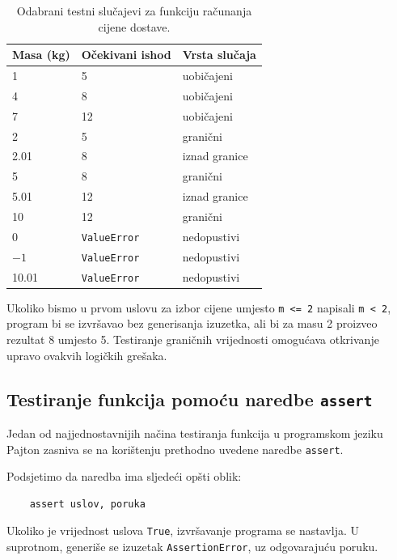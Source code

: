 \begin{table}[ht]
	\centering
	\begin{tabular}{lll}
		\hline
		Masa (kg) & Očekivani ishod & Vrsta slučaja \\ \hline
		1         & 5 & uobičajeni \\
		4         & 8 & uobičajeni \\
		7         & 12 & uobičajeni \\
		2         & 5 & granični \\
		2.01      & 8 & iznad granice \\
		5         & 8 & granični \\
		5.01      & 12 & iznad granice \\
		10        & 12 & granični \\
		0         & \texttt{ValueError} & nedopustivi \\
		$-1$      & \texttt{ValueError} & nedopustivi \\
		10.01     & \texttt{ValueError} & nedopustivi \\ \hline
	\end{tabular}
	\caption{Odabrani testni slučajevi za funkciju 
		računanja cijene dostave.}
	\label{tab:test-dostava}
\end{table}

Ukoliko bismo u prvom uslovu za izbor cijene umjesto 
\texttt{m <= 2} napisali \texttt{m < 2}, program bi se 
izvršavao bez generisanja izuzetka, ali bi za masu 2 
proizveo rezultat 8 umjesto 5. Testiranje graničnih 
vrijednosti omogućava otkrivanje upravo ovakvih 
logičkih grešaka.


\subsection{Testiranje funkcija pomoću naredbe \texttt{assert}}

Jedan od najjednostavnijih načina testiranja funkcija 
u programskom jeziku Pajton zasniva se na korištenju 
prethodno uvedene naredbe \texttt{assert}.

Podsjetimo da naredba ima sljedeći opšti oblik:

\begin{verbatim}
	assert uslov, poruka
\end{verbatim}

Ukoliko je vrijednost uslova \texttt{True}, izvršavanje 
programa se nastavlja. U suprotnom, generiše se izuzetak 
\texttt{AssertionError}, uz odgovarajuću poruku.

